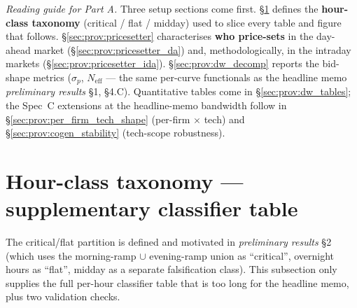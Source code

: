 \documentclass[11pt,a4paper]{article}
\begin{document}
\noindent\emph{Reading guide for Part A.} Three setup sections come first. \S\ref{sec:prov:hour_class} defines the \textbf{hour-class taxonomy} (critical / flat / midday) used to slice every table and figure that follows. \S\ref{sec:prov:pricesetter} characterises \textbf{who price-sets} in the day-ahead market (\S\ref{sec:prov:pricesetter_da}) and, methodologically, in the intraday markets (\S\ref{sec:prov:pricesetter_ida}). \S\ref{sec:prov:dw_decomp} reports the bid-shape metrics ($\sigma_p$, $N_{\text{eff}}$ --- the same per-curve functionals as the headline memo \emph{preliminary results} \S 1, \S 4.C). Quantitative tables come in \S\ref{sec:prov:dw_tables}; the Spec~C extensions at the headline-memo bandwidth follow in \S\ref{sec:prov:per_firm_tech_shape} (per-firm $\times$ tech) and \S\ref{sec:prov:cogen_stability} (tech-scope robustness).

\section{Hour-class taxonomy --- supplementary classifier table}\label{sec:prov:hour_class}

\noindent The critical/flat partition is defined and motivated in
\emph{preliminary results} \S 2 (which uses the morning-ramp $\cup$
evening-ramp union as ``critical'', overnight hours as ``flat'',
midday as a separate falsification class). This subsection only
supplies the full per-hour classifier table that is too long for the
headline memo, plus two validation checks.

\begin{table}[H]
\centering\footnotesize
\caption{\textbf{Hour-of-day classification metrics, Spain 2023--2026} (ENTSO-E A65 + A75, 15-min ISP, $n \approx 3.4$ years of daily observations per hour). The classifier is $\sigma_{\text{within}}$, the expected SD of residual demand (load $-$ wind $-$ solar) across the 4 quarters of each clock-hour. Critical hours: $\sigma_{\text{within}} \in [522, 1303]$. Flat hours: $\sigma_{\text{within}} \in [336, 357]$. Midday: $\sigma_{\text{within}} \in [468, 502]$ (intermediate; excluded from main specs because of the solar-saturation channel). Dropped (transition) hours sit at the regime boundaries. \textit{Year-stability:} across 2023, 2024, 2025 the critical-set min $\sigma_{\text{within}}$ exceeds the flat-set max by $1.4\times$; no within-class swaps across years.}
\label{tab:hour_classification_full}
\newcommand{\critrow}{\rowcolor{red!10}}%
\newcommand{\flatrow}{\rowcolor{blue!10}}%

\end{table}
\end{document}
